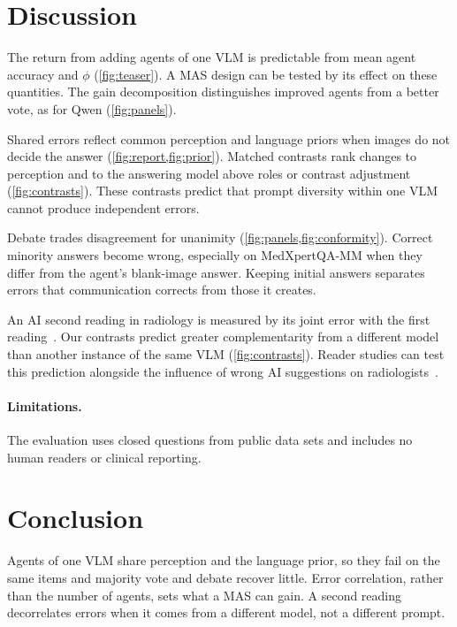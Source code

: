 \section{Discussion}\label{sec:discussion}

The return from adding agents of one VLM is predictable from mean agent accuracy and $\phi$ (\cref{fig:teaser}). A MAS design can be tested by its effect on these quantities. The gain decomposition distinguishes improved agents from a better vote, as for Qwen (\cref{fig:panels}).

Shared errors reflect common perception and language priors when images do not decide the answer (\cref{fig:report,fig:prior}). Matched contrasts rank changes to perception and to the answering model above roles or contrast adjustment (\cref{fig:contrasts}). These contrasts predict that prompt diversity within one VLM cannot produce independent errors.

Debate trades disagreement for unanimity (\cref{fig:panels,fig:conformity}). Correct minority answers become wrong, especially on MedXpertQA-MM when they differ from the agent's blank-image answer. Keeping initial answers separates errors that communication corrects from those it creates.

An AI second reading in radiology is measured by its joint error with the first reading~\cite{geijer2018double}. Our contrasts predict greater complementarity from a different model than another instance of the same VLM (\cref{fig:contrasts}). Reader studies can test this prediction alongside the influence of wrong AI suggestions on radiologists~\cite{dratsch2023automation}.

\paragraph{Limitations.}
The evaluation uses closed questions from public data sets and includes no human readers or clinical reporting.

\section{Conclusion}

Agents of one VLM share perception and the language prior, so they fail on the same items and majority vote and debate recover little. Error correlation, rather than the number of agents, sets what a MAS can gain. A second reading decorrelates errors when it comes from a different model, not a different prompt.
